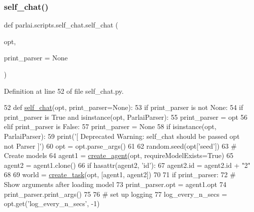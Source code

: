 \subsubsection{\texorpdfstring{self\+\_\+chat()}{self\_chat()}}
{\footnotesize\ttfamily def parlai.\+scripts.\+self\+\_\+chat.\+self\+\_\+chat (\begin{DoxyParamCaption}\item[{}]{opt,  }\item[{}]{print\+\_\+parser = {\ttfamily None} }\end{DoxyParamCaption})}



Definition at line 52 of file self\+\_\+chat.\+py.


\begin{DoxyCode}
52 \textcolor{keyword}{def }\hyperlink{namespaceparlai_1_1scripts_1_1self__chat_a3b20ced8dd92830f75efb0dc18269794}{self\_chat}(opt, print\_parser=None):
53     \textcolor{keywordflow}{if} print\_parser \textcolor{keywordflow}{is} \textcolor{keywordflow}{not} \textcolor{keywordtype}{None}:
54         \textcolor{keywordflow}{if} print\_parser \textcolor{keywordflow}{is} \textcolor{keyword}{True} \textcolor{keywordflow}{and} isinstance(opt, ParlaiParser):
55             print\_parser = opt
56         \textcolor{keywordflow}{elif} print\_parser \textcolor{keywordflow}{is} \textcolor{keyword}{False}:
57             print\_parser = \textcolor{keywordtype}{None}
58     \textcolor{keywordflow}{if} isinstance(opt, ParlaiParser):
59         print(\textcolor{stringliteral}{'[ Deprecated Warning: self\_chat should be passed opt not Parser ]'})
60         opt = opt.parse\_args()
61 
62     random.seed(opt[\textcolor{stringliteral}{'seed'}])
63     \textcolor{comment}{# Create models}
64     agent1 = \hyperlink{namespaceparlai_1_1core_1_1agents_ad0d54074d4bcc148bb415ab5515a53b5}{create\_agent}(opt, requireModelExists=\textcolor{keyword}{True})
65     agent2 = agent1.clone()
66     \textcolor{keywordflow}{if} hasattr(agent2, \textcolor{stringliteral}{'id'}):
67         agent2.id = agent2.id + \textcolor{stringliteral}{"2"}
68 
69     world = \hyperlink{namespaceparlai_1_1core_1_1worlds_a11923c10b545c7ecc1b08fe2242d9c2c}{create\_task}(opt, [agent1, agent2])
70 
71     \textcolor{keywordflow}{if} print\_parser:
72         \textcolor{comment}{# Show arguments after loading model}
73         print\_parser.opt = agent1.opt
74         print\_parser.print\_args()
75 
76     \textcolor{comment}{# set up logging}
77     log\_every\_n\_secs = opt.get(\textcolor{stringliteral}{'log\_every\_n\_secs'}, -1)

\end{DoxyCode}
